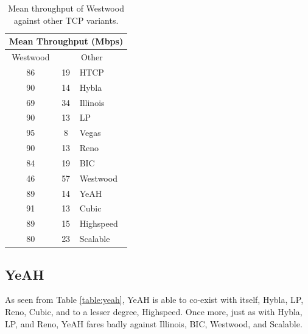 \documentclass[11pt,a4paper,twocolumn]{article}
\begin{document}
\begin{table}[h!]
	\begin{center}
		\begin{tabular}{| c | c | l |}
    			\hline
			\multicolumn{3}{|c|}{Mean Throughput (Mbps)} \\
    			\hline
    			Westwood &  \multicolumn{2}{|c|}{Other}  \\
			\hline
    			86 & 19 & HTCP \\
			\hline
    			90 & 14 & Hybla \\
			\hline
    			69 & 34 & Illinois \\
			\hline
    			90 & 13 & LP \\
			\hline
    			95 & 8 & Vegas \\
			\hline
    			90 & 13 & Reno \\
			\hline
    			84 & 19 & BIC \\
			\hline
    			46 & 57 & Westwood \\
			\hline
    			89 & 14 & YeAH \\
			\hline
    			91 & 13 & Cubic \\
			\hline
    			89 & 15 & Highspeed \\
			\hline
    			80 & 23 & Scalable \\
    			\hline
    		\end{tabular}
  	\end{center}
  	\caption{Mean throughput of Westwood against other TCP variants.}
	\label{table:westwood}
\end{table}

\subsection{YeAH}
\label{subsec:yeah}
As seen from Table \ref{table:yeah}, YeAH is able to co-exist with itself, Hybla, LP, Reno, Cubic, and to 
a lesser degree, Highspeed. 
Once more, just as with Hybla, LP, and Reno, YeAH fares badly against Illinois, BIC, Westwood, and Scalable.
\end{document}
